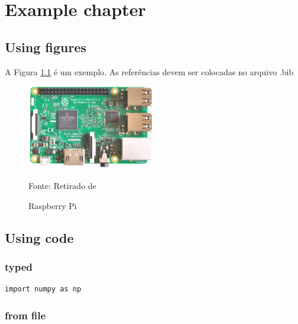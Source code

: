 \documentclass[../../layout.tex]{subfiles}
\begin{document}
\chapter{Example chapter}
\blindtext[1]

\section{Using figures}
A Figura \ref{fig:rpi} é um exemplo. As referências
devem ser colocadas no arquivo .bib

\begin{figure}[H]
\centering
\caption{Raspberry Pi}
\includegraphics[width=0.5\textwidth]{assets/static/img/rpi.jpg}
\label{fig:rpi}

\begin{minipage}{0.5\textwidth}
\raggedright \footnotesize Fonte: Retirado de 
\end{minipage}
\end{figure}

\section{Using code}
\blindtext[2]

\subsection{typed}
\begin{verbatim}
import numpy as np
\end{verbatim}

\subsection{from file}

\end{document}
